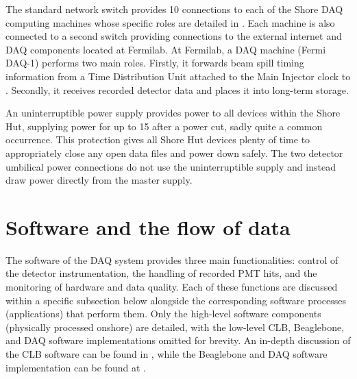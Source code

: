 The standard network switch provides \SI{10}{} connections to each of the Shore DAQ
computing machines whose specific roles are detailed in . Each machine is
also connected to a second switch providing connections to the external internet and DAQ
components located at Fermilab. At Fermilab, a DAQ machine (Fermi DAQ-1) performs two main roles.
Firstly, it forwards \numi beam spill timing information from a Time Distribution Unit attached to
the Main Injector clock to \chipsfive. Secondly, it receives recorded detector data and places it
into long-term storage.

An uninterruptible power supply provides power to all devices within the Shore Hut, supplying
power for up to \SI{15}{} after a power cut, sadly quite a common occurrence. This
protection gives all Shore Hut devices plenty of time to appropriately close any open data files
and power down safely. The two detector umbilical power connections do not use the uninterruptible
supply and instead draw power directly from the master supply.

\section{Software and the flow of data} %
\label{sec:daq_soft} %

The software of the \chipsfive DAQ system provides three main functionalities: control of the
detector instrumentation, the handling of recorded PMT hits, and the monitoring of hardware and
data quality. Each of these functions are discussed within a specific subsection below alongside
the corresponding software processes (applications) that perform them. Only the high-level
software components (physically processed onshore) are detailed, with the low-level CLB,
Beaglebone, and \si{\micro}DAQ software implementations omitted for brevity. An in-depth discussion
of the CLB software can be found in , while the Beaglebone and
\si{\micro}DAQ software implementation can be found at .

